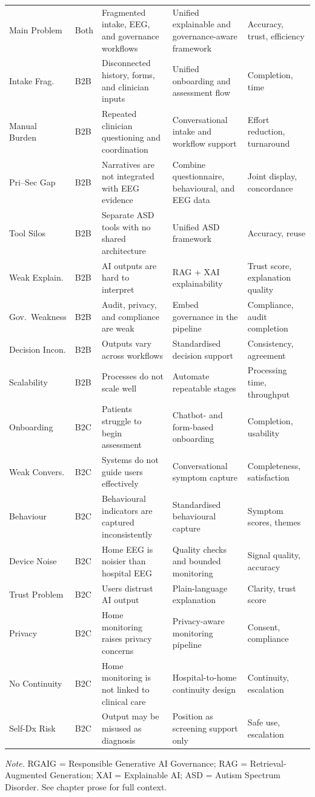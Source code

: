 {\begin{xltabular}{\textwidth}{
>{\raggedright\arraybackslash}p{1.9cm}
>{\centering\arraybackslash}p{1.2cm}
X
X
>{\raggedright\arraybackslash}p{2.2cm}
}
Main Problem & Both & Fragmented intake, EEG, and governance workflows & Unified explainable and governance-aware framework & Accuracy, trust, efficiency \\
Intake Frag. & B2B & Disconnected history, forms, and clinician inputs & Unified onboarding and assessment flow & Completion, time \\
Manual Burden & B2B & Repeated clinician questioning and coordination & Conversational intake and workflow support & Effort reduction, turnaround \\
Pri--Sec Gap & B2B & Narratives are not integrated with EEG evidence & Combine questionnaire, behavioural, and EEG data & Joint display, concordance \\
Tool Silos & B2B & Separate ASD tools with no shared architecture & Unified ASD framework & Accuracy, reuse \\
Weak Explain. & B2B & AI outputs are hard to interpret & RAG + XAI explainability & Trust score, explanation quality \\
Gov.\ Weakness & B2B & Audit, privacy, and compliance are weak & Embed governance in the pipeline & Compliance, audit completion \\
Decision Incon. & B2B & Outputs vary across workflows & Standardised decision support & Consistency, agreement \\
Scalability & B2B & Processes do not scale well & Automate repeatable stages & Processing time, throughput \\
Onboarding & B2C & Patients struggle to begin assessment & Chatbot- and form-based onboarding & Completion, usability \\
Weak Convers. & B2C & Systems do not guide users effectively & Conversational symptom capture & Completeness, satisfaction \\
Behaviour & B2C & Behavioural indicators are captured inconsistently & Standardised behavioural capture & Symptom scores, themes \\
Device Noise & B2C & Home EEG is noisier than hospital EEG & Quality checks and bounded monitoring & Signal quality, accuracy \\
Trust Problem & B2C & Users distrust AI output & Plain-language explanation & Clarity, trust score \\
Privacy & B2C & Home monitoring raises privacy concerns & Privacy-aware monitoring pipeline & Consent, compliance \\
No Continuity & B2C & Home monitoring is not linked to clinical care & Hospital-to-home continuity design & Continuity, escalation \\
Self-Dx Risk & B2C & Output may be misused as diagnosis & Position as screening support only & Safe use, escalation \\
\end{xltabular}
\vspace{0.3em}\noindent\textit{Note.} RGAIG = Responsible Generative AI Governance; RAG = Retrieval-Augmented Generation; XAI = Explainable AI; ASD = Autism Spectrum Disorder. See chapter prose for full context.
}

